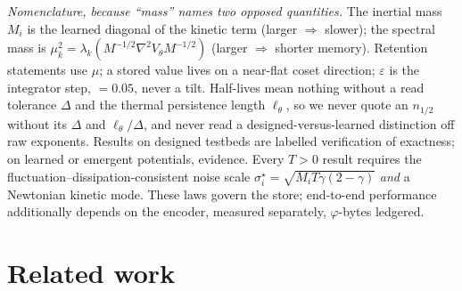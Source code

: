\documentclass{article}
\begin{document}
{\footnotesize\emph{Nomenclature, because ``mass'' names two opposed quantities.} The inertial mass $M_i$ is the learned diagonal of the kinetic term (larger $\Rightarrow$ slower); the spectral mass is $\mu_k^2=\lambda_k(M^{-1/2}\nabla^2V_\theta M^{-1/2})$ (larger $\Rightarrow$ shorter memory). Retention statements use $\mu$; a stored value lives on a near-flat coset direction; $\varepsilon$ is the integrator step, $=0.05$, never a tilt. Half-lives mean nothing without a read tolerance $\Delta$ and the thermal persistence length $\ell_\theta$, so we never quote an $n_{1/2}$ without its $\Delta$ and $\ell_\theta/\Delta$, and never read a designed-versus-learned distinction off raw exponents. Results on designed testbeds are labelled verification of exactness; on learned or emergent potentials, evidence. Every $T>0$ result requires the fluctuation--dissipation-consistent noise scale $\sigma^\star_i=\sqrt{M_iT\gamma(2-\gamma)}$ \emph{and} a Newtonian kinetic mode. These laws govern the store; end-to-end performance additionally depends on the encoder, measured separately, $\varphi$-bytes ledgered.\par}

\section{Related work}\label{sec:related}
\end{document}
